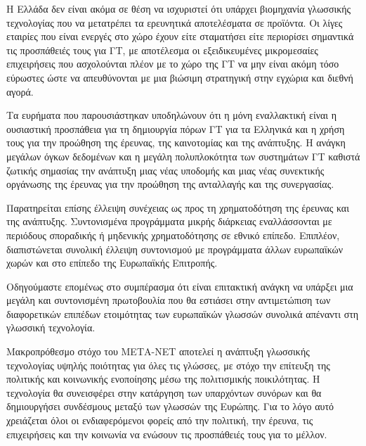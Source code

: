 \documentclass[]{../../metanetpaper}
\begin{document}
\begin{multicols}{2}
Η Ελλάδα δεν είναι ακόμα σε θέση να ισχυριστεί ότι υπάρχει βιομηχανία γλωσσικής τεχνολογίας που να μετατρέπει τα ερευνητικά αποτελέσματα σε προϊόντα. Οι λίγες εταιρίες που είναι ενεργές στο χώρο έχουν είτε σταματήσει είτε περιορίσει σημαντικά τις προσπάθειές τους για ΓΤ, με αποτέλεσμα οι εξειδικευμένες μικρομεσαίες επιχειρήσεις που ασχολούνται πλέον με το χώρο της ΓΤ να μην είναι ακόμη τόσο εύρωστες ώστε να απευθύνονται με μια  βιώσιμη στρατηγική στην εγχώρια και διεθνή αγορά. 

Τα ευρήματα που παρουσιάστηκαν υποδηλώνουν ότι η μόνη εναλλακτική είναι η ουσιαστική προσπάθεια για τη δημιουργία πόρων ΓΤ για τα Ελληνικά και η χρήση τους για την προώθηση της έρευνας, της καινοτομίας και της ανάπτυξης. Η ανάγκη μεγάλων όγκων δεδομένων και η μεγάλη πολυπλοκότητα των συστημάτων ΓΤ καθιστά ζωτικής σημασίας την ανάπτυξη μιας νέας υποδομής και μιας νέας συνεκτικής οργάνωσης της έρευνας για την προώθηση της ανταλλαγής και της συνεργασίας.

Παρατηρείται επίσης έλλειψη συνέχειας ως προς τη χρηματοδότηση της έρευνας και της ανάπτυξης. Συντονισμένα προγράμματα μικρής διάρκειας εναλλάσσονται με περιόδους σποραδικής ή μηδενικής χρηματοδότησης σε εθνικό επίπεδο. Επιπλέον, διαπιστώνεται συνολική έλλειψη συντονισμού με προγράμματα άλλων ευρωπαϊκών χωρών και στο επίπεδο της Ευρωπαϊκής Επιτροπής.

Οδηγούμαστε επομένως στο συμπέρασμα ότι είναι επιτακτική ανάγκη να υπάρξει μια μεγάλη και συντονισμένη πρωτοβουλία που θα εστιάσει στην αντιμετώπιση των διαφορετικών επιπέδων ετοιμότητας των ευρωπαϊκών γλωσσών συνολικά απέναντι στη γλωσσική τεχνολογία. 

Μακροπρόθεσμο στόχο του ΜΕΤΑ-ΝΕΤ αποτελεί η ανάπτυξη γλωσσικής τεχνολογίας υψηλής ποιότητας για όλες τις γλώσσες, με στόχο την επίτευξη της πολιτικής και κοινωνικής ενοποίησης μέσω της πολιτισμικής ποικιλότητας. Η τεχνολογία θα συνεισφέρει στην κατάργηση των υπαρχόντων συνόρων και θα δημιουργήσει συνδέσμους μεταξύ των γλωσσών της Ευρώπης. Για το λόγο αυτό χρειάζεται όλοι οι ενδιαφερόμενοι φορείς  από την πολιτική, την έρευνα, τις επιχειρήσεις και την κοινωνία να ενώσουν τις προσπάθειές τους για το μέλλον.
\end{multicols}

\clearpage
\end{document}
